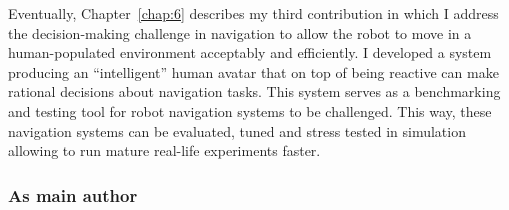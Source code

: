 Eventually, Chapter~\ref{chap:6} describes my third contribution in which I address the decision-making challenge in navigation to allow the robot to move in a human-populated environment acceptably and efficiently. I developed a system producing an ``intelligent'' human avatar that on top of being reactive can make rational decisions about navigation tasks. This system serves as a benchmarking and testing tool for robot navigation systems to be challenged. This way, these navigation systems can be evaluated, tuned and stress tested in simulation allowing to run mature real-life experiments faster.  





\subsubsection*{As main author}
